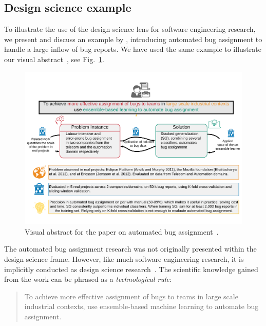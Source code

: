 \documentclass[graybox]{svmult}
\begin{document}
\subsection{Design science example}
\label{sec:examples}
To illustrate the use of the design science lens for software engineering research, we present and discuss an example by \cite{JonssonBug15}, introducing automated bug assignment to handle a large inflow of bug reports. We have used the same example to illustrate our visual abstract~\citep{StoreyESEM17}, see Fig.~\ref{fig:BugAssignment}.

\begin{figure}[t]
\begin{center}
\includegraphics[width=\columnwidth, trim={5mm 20mm 5mm 20mm },clip]{Figures/VATemplateJonsson.pdf}
\caption{Visual abstract for the paper on automated bug assignment~\citep{JonssonBug15}.}
\label{fig:BugAssignment}
\end{center}
\end{figure}

The automated bug assignment research was not originally presented within the design science frame. However, like much software engineering research, it is implicitly conducted as design science research~\citep{Engstrom19arxiv}. 
The scientific knowledge gained from the work can be phrased as a \emph{technological rule}:
\begin{quote}{To achieve more effective assignment of bugs to teams in large scale industrial contexts, use ensemble-based machine learning to automate bug assignment.}\end{quote}
\end{document}
